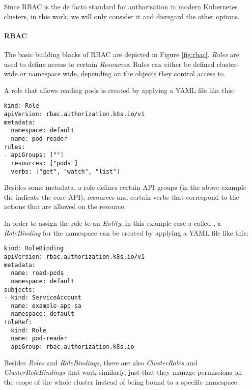 
Since \ac{RBAC} is the de facto standard for authorisation in modern Kubernetes clusters, in this work, we will only consider it and disregard the other options.

\paragraph{\ac{RBAC}}


The basic building blocks of \ac{RBAC} are depicted in Figure \ref{fig:rbac}. \textit{Roles} are used to define access to certain \textit{Resources}. Rules can either be defined cluster-wide or namespace wide, depending on the objects they control access to.

A role that allows reading pods is created by applying a YAML file like this: 

\begin{lstlisting}[frame=single]
kind: Role
apiVersion: rbac.authorization.k8s.io/v1
metadata:
  namespace: default
  name: pod-reader
rules:
- apiGroups: [""]
  resources: ["pods"]
  verbs: ["get", "watch", "list"]
\end{lstlisting}

Besides some metadata, a role defines certain API groups (in the above example the  indicate the core API), resources and certain verbs that correspond to the actions that are allowed on the resource. 

In order to assign the role to an \textit{Entity}, in this example case a  called , a \textit{RoleBinding} for the namespace  can be created by applying a YAML file like this:

\begin{lstlisting}[frame=single]
kind: RoleBinding
apiVersion: rbac.authorization.k8s.io/v1
metadata:
  name: read-pods
  namespace: default
subjects:
- kind: ServiceAccount
  name: example-app-sa 
  namespace: default
roleRef:
  kind: Role
  name: pod-reader
  apiGroup: rbac.authorization.k8s.io
\end{lstlisting}

Besides \textit{Roles} and \textit{RoleBindings}, there are also \textit{ClusterRoles} and \textit{ClusterRoleBindings} that work similarly, just that they manage permissions on the scope of the whole cluster instead of being bound to a specific namespace.

